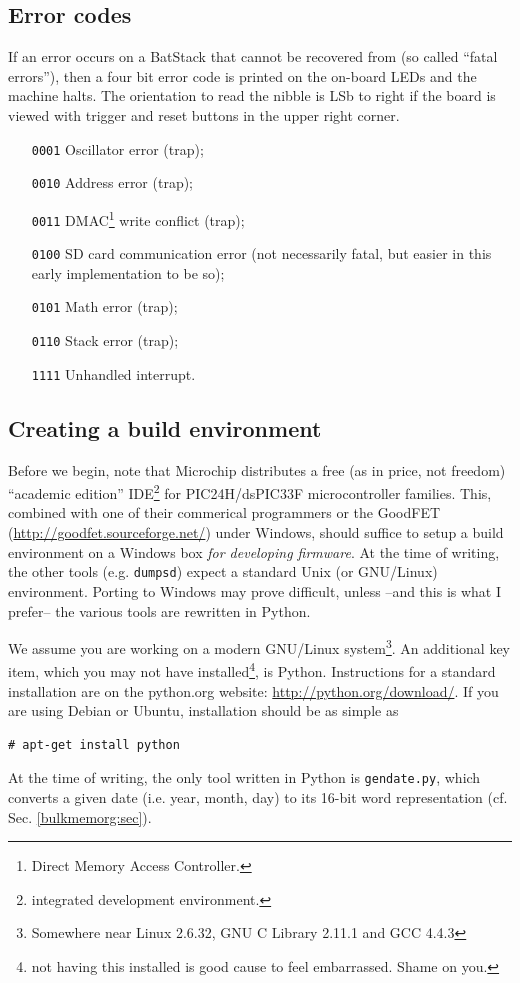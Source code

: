 \documentclass[letterpaper]{article}
\begin{document}
\subsection{Error codes}
\label{errorcode:sec}

If an error occurs on a BatStack that cannot be recovered from (so
called ``fatal errors''), then a four bit error code is printed on the
on-board LEDs and the machine halts. The orientation to read the
nibble is LSb to right if the board is viewed with trigger and reset
buttons in the upper right corner.
\begin{itemize}
  \item[\texttt{0001}] Oscillator error (trap);
  \item[\texttt{0010}] Address error (trap);
  \item[\texttt{0011}] DMAC\footnote{Direct Memory Access Controller.}
    write conflict (trap);
  \item[\texttt{0100}] SD card communication error (not necessarily
    fatal, but easier in this early implementation to be so);
  \item[\texttt{0101}] Math error (trap);
  \item[\texttt{0110}] Stack error (trap);
  \item[\texttt{1111}] Unhandled interrupt.
\end{itemize}


\subsection{Creating a build environment}
\label{createbuildenv:sec}

Before we begin, note that Microchip distributes a free (as in price,
not freedom) ``academic edition'' IDE\footnote{integrated development
  environment.} for PIC24H/dsPIC33F microcontroller families. This,
combined with one of their commerical programmers or the GoodFET
(\url{http://goodfet.sourceforge.net/}) under Windows, should suffice
to setup a build environment on a Windows box \textit{for developing
  firmware}. At the time of writing, the other tools
(e.g. \texttt{dumpsd}) expect a standard Unix (or GNU/Linux)
environment. Porting to Windows may prove difficult, unless --and this
is what I prefer-- the various tools are rewritten in Python.

We assume you are working on a modern GNU/Linux
system\footnote{Somewhere near Linux 2.6.32, GNU C Library 2.11.1 and
  GCC 4.4.3}. An additional key item, which you may not have
installed\footnote{not having this installed is good cause to feel
  embarrassed. Shame on you.}, is Python. Instructions for a standard
installation are on the \mbox{python.org} website:
\url{http://python.org/download/}. If you are using Debian or Ubuntu,
installation should be as simple as
\begin{verbatim}
# apt-get install python
\end{verbatim}
At the time of writing, the only
tool written in Python is \texttt{gendate.py}, which converts a given
date (i.e. year, month, day) to its 16-bit word representation
(cf. Sec. \ref{bulkmemorg:sec}).
\end{document}
